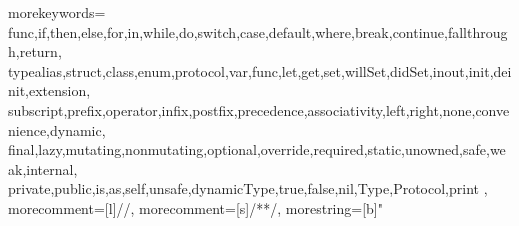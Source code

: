 
\usepackage{amssymb,amsmath,verbatim,graphicx,pdfpages,microtype,units,booktabs,upquote,xcolor,siunitx,csquotes,fancyvrb,newverbs,wrapfig,multicol,tikz,textcomp,wrapfig,cutwin}
\usepackage{fontawesome,setspace,rotchiffre,lipsum,listings,animate,listings}
\usepackage[xspace]{ellipsis}

\hypersetup{%
            colorlinks = true,
            linkcolor = orange,
            urlcolor  = orange,
            citecolor = orange,
            anchorcolor = orange}

\newcommand{\hugeslide}[1]{%
\begin{frame}[plain,c]
    \centering {\usebeamerfont*{frametitle} \usebeamercolor[fg]{frametitle}{\fontsize{40}{50}\selectfont\textit{_num_1}}}
\end{frame}
}

\newcommand{\presentby}[2]{%
    \note{%
        \topskip0pt
        \vspace*{\fill}
        \huge \textbf{_num_1, \textit{_num_2} Minute(s)}
        \vspace*{\fill}
    }
}

\newcommand{\presentaddcount}[1]{\addtocounter{_num_1}{1}\Roman{_num_1}}
\newcommand{\presentcount}[1]{\Roman{_num_1}}
\newcommand{\shellcmd}[1]{\texttt{\colorbox{gray!30}{#1}}}

{%
  morekeywords={%
    func,if,then,else,for,in,while,do,switch,case,default,where,break,continue,fallthrough,return,
    typealias,struct,class,enum,protocol,var,func,let,get,set,willSet,didSet,inout,init,deinit,extension,
    subscript,prefix,operator,infix,postfix,precedence,associativity,left,right,none,convenience,dynamic,
    final,lazy,mutating,nonmutating,optional,override,required,static,unowned,safe,weak,internal,
    private,public,is,as,self,unsafe,dynamicType,true,false,nil,Type,Protocol,print
  },
  morecomment=[l]{//}, %
  morecomment=[s]{/*}{*/}, %
  morestring=[b]" %
}



\newcommand\syntaxbox[2][fill=orange!80]{%
    \tikz[baseline]\node[%
        inner ysep=0pt,
        inner xsep=2pt,
        anchor=text,
        rectangle,
        rounded corners=1mm,
        _num_1] {\strut_num_2};%
}

